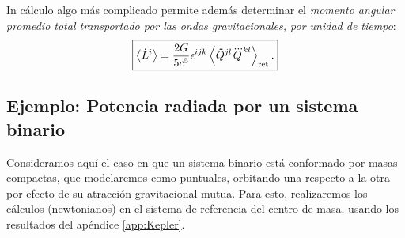 In cálculo algo más complicado \cite{Maggiore} permite además determinar el \textit{momento angular promedio total transportado por las ondas gravitacionales, por unidad de tiempo}:
\begin{equation}\label{eqfinal}
\boxed{\left\langle\dot{L}^{i}\right\rangle=\frac{2G}{5c^{5}}\epsilon^{ijk} \left\langle\ddot{Q}^{jl}\dddot{Q}^{kl}\right\rangle_{\rm ret}.}
\end{equation}
\subsection{Ejemplo: Potencia radiada por un sistema binario}
Consideramos aquí el caso en que un sistema binario está conformado por masas compactas, que modelaremos como puntuales, orbitando una respecto a la otra por efecto de su atracción gravitacional mutua. Para esto, realizaremos los cálculos (newtonianos) en el sistema de referencia del centro de masa, usando los resultados del apéndice \ref{app:Kepler}.

